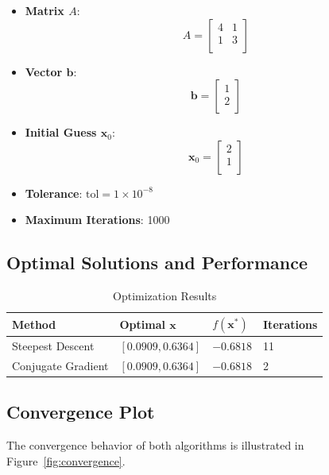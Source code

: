 \documentclass[a4paper, 12pt]{article}
\begin{document}
\begin{itemize}
    \item \textbf{Matrix \( A \)}:
    \[
    A = \begin{bmatrix}
    4 & 1 \\
    1 & 3 \\
    \end{bmatrix}
    \]
    \item \textbf{Vector \( \mathbf{b} \)}:
    \[
    \mathbf{b} = \begin{bmatrix}
    1 \\
    2 \\
    \end{bmatrix}
    \]
    \item \textbf{Initial Guess \( \mathbf{x}_0 \)}:
    \[
    \mathbf{x}_0 = \begin{bmatrix}
    2 \\
    1 \\
    \end{bmatrix}
    \]
    \item \textbf{Tolerance}: \( \text{tol} = 1 \times 10^{-8} \)
    \item \textbf{Maximum Iterations}: 1000
\end{itemize}

\subsection*{Optimal Solutions and Performance}

\begin{table}[h]
    \centering
    \caption{Optimization Results}
    \begin{tabular}{@{}llll@{}}
        \toprule
        \textbf{Method} & \textbf{Optimal \( \mathbf{x} \)} & \textbf{\( f(\mathbf{x}^*) \)} & \textbf{Iterations} \\ \midrule
        Steepest Descent & $[0.0909, 0.6364]$ & $-0.6818$ & 11 \\
        Conjugate Gradient & $[0.0909, 0.6364]$ & $-0.6818$ & 2 \\
        \bottomrule
    \end{tabular}
\end{table}

\newpage
\subsection*{Convergence Plot}

The convergence behavior of both algorithms is illustrated in Figure~\ref{fig:convergence}.
\end{document}

